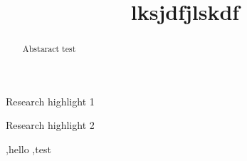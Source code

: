 \documentclass[preprint,12pt,authoryear]{elsarticle}
\begin{document}
\begin{frontmatter}



\title{lksjdfjlskdf} %


\author{} %


\begin{abstract}
Abstaract test
\end{abstract}


\begin{highlights}
\item Research highlight 1
\item Research highlight 2
\end{highlights}

\begin{keyword}
\sep hello
\sep test


\end{keyword}

\end{frontmatter}
\end{document}
